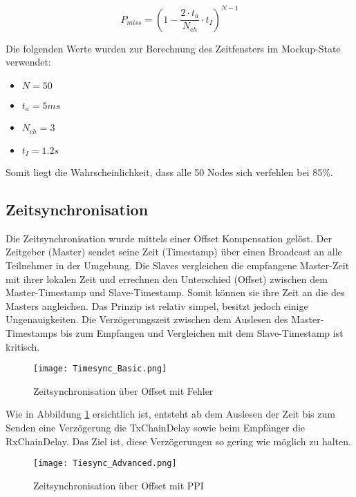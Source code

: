 \begin{equation}\label{eq:BroadcastingMissProbability}
P_{miss} = (1- \frac{2 \cdot t_a}{N_{ch}} \cdot t_I)^{N-1}
\end{equation}

Die folgenden Werte wurden zur Berechnung des Zeitfensters im Mockup-State verwendet:

\begin{itemize}
	\item $N = 50$
	\item $t_a = 5ms$
	\item $N_{ch} = 3$
	\item $t_I = 1.2s$	
\end{itemize} 

Somit liegt die Wahrscheinlichkeit, dass alle 50 Nodes sich verfehlen bei 85\%. 

\subsection{Zeitsynchronisation}\label{sec:ZeitsynchronisationP2P}
Die Zeitsynchronisation wurde mittels einer Offset Kompensation gelöst.
Der Zeitgeber (Master) sendet seine Zeit (Timestamp) über einen Broadcast an alle Teilnehmer in der Umgebung.
Die Slaves vergleichen die empfangene Master-Zeit mit ihrer lokalen Zeit und errechnen den Unterschied (Offset) zwischen dem Master-Timestamp und Slave-Timestamp.
Somit können sie ihre Zeit an die des Masters angleichen. Das Prinzip ist relativ simpel, besitzt jedoch einige Ungenauigkeiten. Die Verzögerungszeit zwischen dem Auslesen des Master-Timestamps bis zum Empfangen und Vergleichen mit dem Slave-Timestamp ist kritisch.  

\begin{figure} [H]
	\centering
	\texttt{[image: Timesync\_Basic.png]}
	\caption{Zeitsynchronisation über Offset mit Fehler}
	\label{fig:TimesyncBasicwithErrorP2P}
\end{figure}

Wie in Abbildung \ref{fig:TimesyncBasicwithErrorP2P} ersichtlich ist, entsteht ab dem Auslesen der Zeit bis zum Senden eine Verzögerung die TxChainDelay sowie beim Empfänger die RxChainDelay. Das Ziel ist, diese Verzögerungen so gering wie möglich zu halten. 

\begin{figure} [H]
	\centering
	\texttt{[image: Tiesync\_Advanced.png]}
	\caption{Zeitsynchronisation über Offset mit PPI}
	\label{fig:TimesyncwithPPIP2P}
\end{figure}

